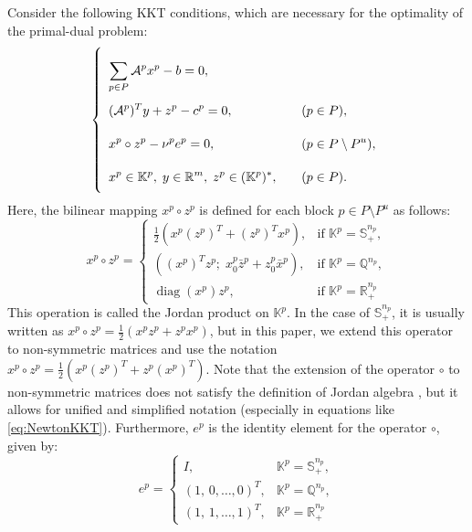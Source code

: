 \documentclass{scrartcl}
\begin{document}
\medskip

\noindent
Consider the following KKT conditions, which are necessary for the optimality of the primal-dual problem:
\begin{equation}
    \everymath{\displaystyle}
    \renewcommand{\arraystretch}{2.5}
    \left\{
    \begin{array}{ll}
        \sum_{p \in P} \mathcal{A}^p x^p - b = 0, & \\[-4pt]
        (\mathcal{A}^p)^T y + z^p - c^p = 0, & \quad (p \in P),\\[-4pt]
        x^p \circ z^p - \nu^p e^p = 0, & \quad (p \in P \setminus P^u),\\[-4pt]
        x^p \in \mathbb{K}^p,\; y \in \mathbb{R}^m,\; z^p \in (\mathbb{K}^p)^*, & \quad (p \in P).
    \end{array}
    \right.
    \label{eq:KKTcond}
\end{equation}
Here, the bilinear mapping $x^p \circ z^p$ is defined for each block $p \in P \setminus P^u$ as follows:
\[
  x^p \circ z^p = 
  \begin{cases}
    \frac{1}{2} \left( x^p (z^p)^T + (z^p)^T x^p \right), 
      & \text{if } \mathbb{K}^p = \mathbb{S}^{n_p}_+,\\[4pt]
    \left( (x^p)^T z^p;\; x^p_0 \bar{z}^p + z^p_0 \bar{x}^p \right),
      & \text{if } \mathbb{K}^p = \mathbb{Q}^{n_p},\\[4pt]
    \operatorname{diag}(x^p) z^p,
      & \text{if } \mathbb{K}^p = \mathbb{R}^{n_p}_+ %
  \end{cases}
\]
This operation is called the Jordan product on $\mathbb{K}^p$. In the case of $\mathbb{S}^{n_p}_+$, it is usually written as $x^p \circ z^p = \frac{1}{2}(x^p z^p + z^p x^p)$, but in this paper, we extend this operator to non-symmetric matrices and use the notation $x^p \circ z^p = \frac{1}{2} \left( x^p (z^p)^T + z^p (x^p)^T \right)$. Note that the extension of the operator $\circ$ to non-symmetric matrices does not satisfy the definition of Jordan algebra \cite{Faraut1994}, but it allows for unified and simplified notation (especially in equations like \eqref{eq:NewtonKKT}). Furthermore, $e^p$ is the identity element for the operator $\circ$, given by:
\[
  e^p = 
  \begin{cases}
    I, & \mathbb{K}^p = \mathbb{S}^{n_p}_+,\\[3pt]
    (1,\,0,\ldots,0)^T, & \mathbb{K}^p = \mathbb{Q}^{n_p},\\[3pt]
    (1,\,1,\ldots,1)^T, & \mathbb{K}^p = \mathbb{R}^{n_p}_+ %
  \end{cases}
\]
\end{document}
